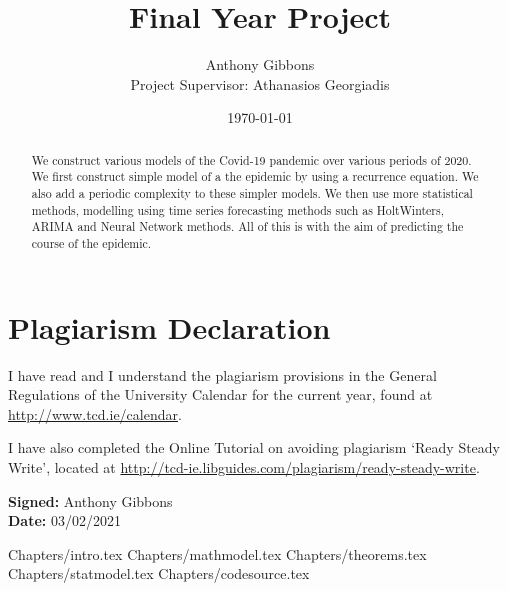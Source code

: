 \documentclass[a4paper]{article}
\title{Final Year Project}
\author{Anthony Gibbons \qquad 17322353 \\ Project Supervisor: Athanasios Georgiadis}
\date{\today}
\begin{document}
\maketitle      

\begin{abstract}
    We construct various models of the Covid-19 pandemic over various periods of 2020. We first construct simple model of a the epidemic by using a recurrence equation. We also add a periodic complexity to these simpler models. We then use more statistical methods, modelling using time series forecasting methods such as HoltWinters, ARIMA and Neural Network methods. All of this is with the aim of predicting the course of the epidemic.
\end{abstract}
\pagebreak
\section*{Plagiarism Declaration}
I have read and I understand the plagiarism provisions in the General
Regulations of the University Calendar for the current year, found at
\url{http://www.tcd.ie/calendar}.

I have also completed the Online Tutorial on avoiding plagiarism
‘Ready Steady Write’, located at
\url{http://tcd-ie.libguides.com/plagiarism/ready-steady-write}.

\textbf{Signed:} Anthony Gibbons \\
\textbf{Date:} 03/02/2021
\pagebreak

\hypersetup{
    linkcolor=black,
}

\tableofcontents \pagebreak

\listoffigures \pagebreak

{Chapters/intro.tex}
\pagebreak
{Chapters/mathmodel.tex}
\pagebreak
{Chapters/theorems.tex}
\pagebreak
{Chapters/statmodel.tex}
\pagebreak
{Chapters/codesource.tex}
\pagebreak 
\printbibliography
\end{document}
